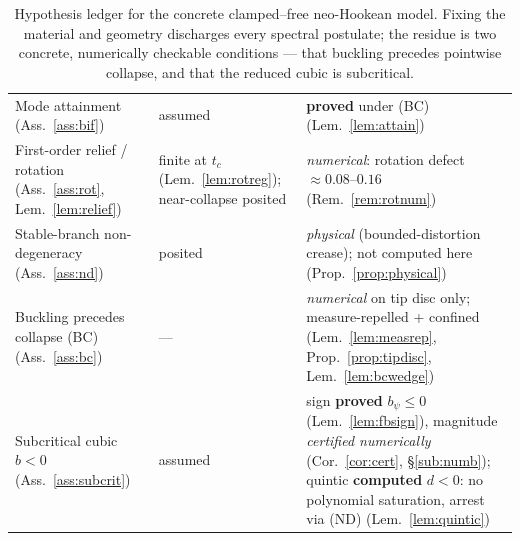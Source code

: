 \begin{table}[t]
\begin{tabular}{lll}
        Mode attainment (Ass.~\ref{ass:bif})                                      & assumed                                                        & \textbf{proved} under (BC) (Lem.~\ref{lem:attain})                                                              \\
        First-order relief / rotation (Ass.~\ref{ass:rot}, Lem.~\ref{lem:relief}) & finite at $t_c$ (Lem.~\ref{lem:rotreg}); near-collapse posited & \emph{numerical}: rotation defect ${\approx}0.08$--$0.16$ (Rem.~\ref{rem:rotnum})                               \\
        Stable-branch non-degeneracy (Ass.~\ref{ass:nd})                          & posited                                                        & \emph{physical} (bounded-distortion crease); not computed here (Prop.~\ref{prop:physical})                      \\
        \midrule
        Buckling precedes collapse (BC) (Ass.~\ref{ass:bc})                       & ---                                                            & \emph{numerical} on tip disc only; measure-repelled + confined (Lem.~\ref{lem:measrep}, Prop.~\ref{prop:tipdisc}, Lem.~\ref{lem:bcwedge})  \\
        Subcritical cubic $b<0$ (Ass.~\ref{ass:subcrit})                          & assumed                                                        & sign \textbf{proved} $b_\psi{\le}0$ (Lem.~\ref{lem:fbsign}), magnitude \emph{certified numerically} (Cor.~\ref{cor:cert}, \S\ref{sub:numb}); quintic \textbf{computed} $d{<}0$: no polynomial saturation, arrest via (ND) (Lem.~\ref{lem:quintic})     \\
        \bottomrule
    \end{tabular}
    \caption{Hypothesis ledger for the concrete clamped--free neo-Hookean model. Fixing the material and geometry
        discharges every spectral postulate; the residue is two concrete, numerically checkable conditions --- that
        buckling precedes pointwise collapse, and that the reduced cubic is subcritical.}
    \label{tab:status}
\end{table}

